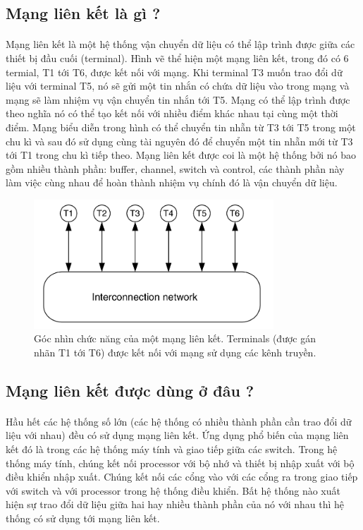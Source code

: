 \documentclass[../report.tex]{subfiles}
\begin{document}
\subsection{Mạng liên kết là gì ?}   
\paragraph*{}Mạng liên kết là một hệ thống vận chuyển dữ liệu có thể lập trình được giữa các thiết bị đầu cuối (terminal). Hình vẽ thể hiện một mạng liên kết, trong đó có 6 termial, T1 tới T6, được kết nối với mạng. Khi terminal T3 muốn trao đổi dữ liệu với terminal T5, nó sẽ gửi một tin nhắn có chứa dữ liệu vào trong mạng và mạng sẽ làm nhiệm vụ vận chuyển tin nhắn tới T5. Mạng có thể lập trình được theo nghĩa nó có thể tạo kết nối với nhiều điểm khác nhau tại cùng một thời điểm. Mạng biểu diễn trong hình có thể chuyển tin nhẵn từ T3 tới T5 trong một chu kì và sau đó sử dụng cùng tài nguyên đó để chuyển một tin nhẵn mới từ T3 tới T1 trong chu kì tiếp theo. Mạng liên kết được coi là một hệ thống bởi nó bao gồm nhiều thành phần: buffer, channel, switch và control, các thành phần này làm việc cùng nhau để hoàn thành nhiệm vụ chính đó là vận chuyển dữ liệu.
\begin{figure}[H]
\centering
\includegraphics[width=9cm]{figures/interconnection.png}
\caption{Góc nhìn chức năng của một mạng liên kết. Terminals (được gán nhãn T1 tới T6) được kết nối với mạng sử dụng các kênh truyền.}
\end{figure}

\subsection{Mạng liên kết được dùng ở đâu ?}
\paragraph*{} Hầu hết các hệ thống số lớn (các hệ thống có nhiều thành phần cần trao đổi dữ liệu với nhau) đều có sử dụng mạng liên kết. Ứng dụng phổ biến của mạng liên kết đó là trong các hệ thống máy tính và giao tiếp giữa các switch. Trong hệ thống máy tính, chúng kết nối processor với bộ nhớ và thiết bị nhập xuất với bộ điều khiển nhập xuất. Chúng kết nối các cổng vào với các cổng ra trong giao tiếp với switch và với processor trong hệ thống điều khiển. Bất hệ thống nào xuất hiện sự trao đổi dữ liệu giữa hai hay nhiều thành phần của nó với nhau thì hệ thống có sử dụng tới mạng liên kết.
\end{document}
